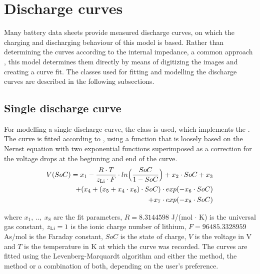 \section{Discharge curves}
\label{sec:dischargeCurvesMain}
Many battery data sheets provide measured discharge curves, on which the charging and discharging behaviour of this model is based. Rather than determining the curves according to the internal impedance, a common approach \cite{lijun_gao_dynamic_2002}, this model determines them directly by means of digitizing the images and creating a curve fit. The classes used for fitting and modelling the discharge curves are described in the following subsections.

\subsection{Single discharge curve}
\label{sec:dischargeFit}
For modelling a single discharge curve, the class  is used, which implements the . The curve is fitted according to \cite{werder_entwicklung_2014}, using a function that is loosely based on the Nernst equation with two exponential functions superimposed as a correction for the voltage drops at the beginning and end of the curve.
\begin{equation}
\begin{aligned}
V(SoC) = x_1 - \frac{R\cdot T}{z_\text{Li}\cdot F}\cdot ln\Big(\frac{SoC}{1-SoC}\Big)
+ x_2\cdot SoC + x_3 \\
+ (x_4 + (x_5 + x_4\cdot x_6)\cdot SoC)\cdot exp(-x_6\cdot SoC) \\
+ x_7\cdot exp(-x_8\cdot SoC)
\end{aligned}
\end{equation}

where $x_1,\ ..,\ x_8$ are the fit parameters, $R = 8.3144598$ J/(mol $\cdot$ K) is the universal gas constant, $z_\text{Li} = 1$ is the ionic charge number of lithium, $F = 96485.3328959$ As/mol is the Faraday constant, $SoC$ is the state of charge, $V$ is the voltage in V and $T$ is the temperature in K at which the curve was recorded. The curves are fitted using the Levenberg-Marquardt algorithm and either the  method, the  method or a combination of both, depending on the user's preference. 

